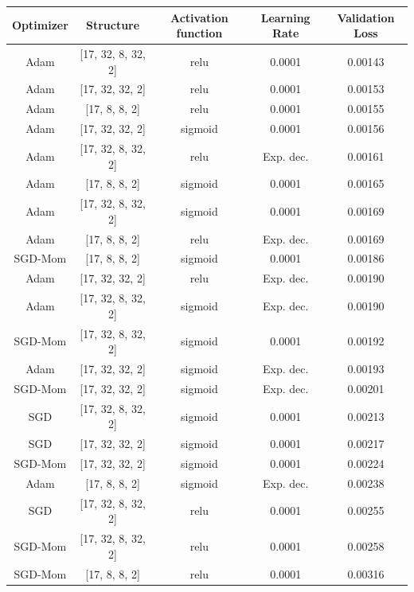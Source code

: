 \begin{table}[H]
    \centering
    \begin{tabular}{|c|c|c|c|c|}
    \hline
        Optimizer & Structure & Activation function & Learning Rate & Validation Loss \\ \hline
        Adam & [17, 32, 8, 32, 2] & relu & 0.0001 & 0.00143 \\ \hline
        Adam & [17, 32, 32, 2] & relu & 0.0001 & 0.00153 \\ \hline
        Adam & [17, 8, 8, 2] & relu & 0.0001 & 0.00155 \\ \hline
        Adam & [17, 32, 32, 2] & sigmoid & 0.0001 & 0.00156 \\ \hline
        Adam & [17, 32, 8, 32, 2] & relu & Exp. dec. & 0.00161 \\ \hline
        Adam & [17, 8, 8, 2] & sigmoid & 0.0001 & 0.00165 \\ \hline
        Adam & [17, 32, 8, 32, 2] & sigmoid & 0.0001 & 0.00169 \\ \hline
        Adam & [17, 8, 8, 2] & relu & Exp. dec. & 0.00169 \\ \hline
        SGD-Mom & [17, 8, 8, 2] & sigmoid & 0.0001 & 0.00186 \\ \hline
        Adam & [17, 32, 32, 2] & relu & Exp. dec. & 0.00190 \\ \hline
        Adam & [17, 32, 8, 32, 2] & sigmoid & Exp. dec. & 0.00190 \\ \hline
        SGD-Mom & [17, 32, 8, 32, 2] & sigmoid & 0.0001 & 0.00192 \\ \hline
        Adam & [17, 32, 32, 2] & sigmoid & Exp. dec. & 0.00193 \\ \hline
        SGD-Mom & [17, 32, 32, 2] & sigmoid & Exp. dec. & 0.00201 \\ \hline
        SGD & [17, 32, 8, 32, 2] & sigmoid & 0.0001 & 0.00213 \\ \hline
        SGD & [17, 32, 32, 2] & sigmoid & 0.0001 & 0.00217 \\ \hline
        SGD-Mom & [17, 32, 32, 2] & sigmoid & 0.0001 & 0.00224 \\ \hline
        Adam & [17, 8, 8, 2] & sigmoid & Exp. dec. & 0.00238 \\ \hline
        SGD & [17, 32, 8, 32, 2] & relu & 0.0001 & 0.00255 \\ \hline
        SGD-Mom & [17, 32, 8, 32, 2] & relu & 0.0001 & 0.00258 \\ \hline
        SGD-Mom & [17, 8, 8, 2] & relu & 0.0001 & 0.00316 \\ \hline

\end{tabular}
\end{table}

